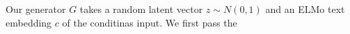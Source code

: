 Our generator $G$ takes a random latent vector $z \sim N(0, 1)$ and an ELMo text embedding $c$ of the conditinas input. We first pass the 